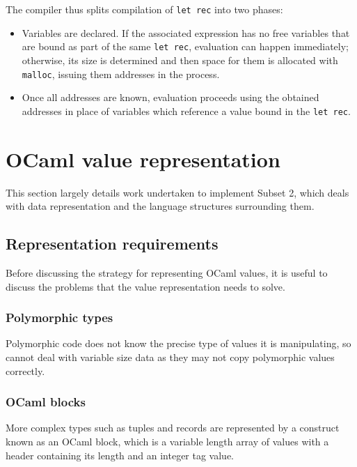 \documentclass[12pt,a4paper,twoside,openright]{report}
\begin{document}
The compiler thus splits compilation of \texttt{let rec} into two phases:

\begin{itemize} 
    
\item Variables are declared. If the associated expression has no free variables
    that are bound as part of the same \texttt{let rec}, evaluation can happen
    immediately; otherwise, its size is determined and then space for them is
    allocated with \texttt{malloc}, issuing them addresses in the process.        

\item Once all addresses are known, evaluation proceeds using the obtained
    addresses in place of variables which reference a value bound in the
    \texttt{let rec}.

\end{itemize}

\section{OCaml value representation} \label{value-repr}

This section largely details work undertaken to implement Subset 2, which deals 
with data representation and the language structures surrounding them.

\subsection{Representation requirements}

Before discussing the strategy for representing OCaml values, it is useful to
discuss the problems that the value representation needs to solve.

\subsubsection{Polymorphic types}

Polymorphic code does not know the precise type of values it is manipulating, so
cannot deal with variable size data as they may not copy polymorphic values
correctly.

\subsubsection{OCaml blocks}

More complex types such as tuples and records are represented by a construct
known as an OCaml block, which is a variable length array of values with a
header containing its length and an integer tag value.
\end{document}
